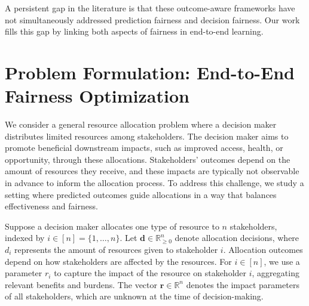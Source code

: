 \documentclass[ijoc,sglanonrev]{informs4}
\begin{document}


A persistent gap in the literature is that these outcome-aware frameworks have not simultaneously addressed prediction fairness and decision fairness. Our work fills this gap by linking both aspects of fairness in end-to-end learning.

\section{Problem Formulation: End-to-End Fairness Optimization} \label{sec:prob}
We consider a general resource allocation problem where a decision maker distributes limited resources among stakeholders. 
The decision maker aims to promote beneficial downstream impacts, such as improved access, health, or opportunity, through these allocations. Stakeholders' outcomes depend on the amount of resources they receive, and these impacts are typically not observable in advance to inform the allocation process. To address this challenge, we study a setting where predicted outcomes guide allocations in a way that balances effectiveness and fairness. 

Suppose a decision maker allocates one type of resource to $n$ stakeholders, indexed by $i \in [n] = \{1, \ldots, n\}$. Let $\mathbf{d} \in \mathbb{R}^n_{\geq 0}$ denote allocation decisions, where $d_i$ represents the amount of resources given to stakeholder $i$. Allocation outcomes depend on how stakeholders are affected by the resources. For $i \in [n]$, we use a parameter $r_i$ to capture the impact of the resource on stakeholder $i$, aggregating relevant benefits and burdens. The vector $\mathbf{r} \in \mathbb{R}^n$ denotes the impact parameters of all stakeholders, which are unknown at the time of decision-making. 
\end{document}
